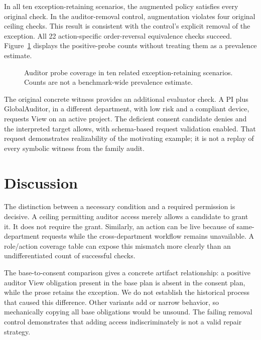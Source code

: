 \documentclass[sigconf,nonacm]{acmart}
\begin{document}
In all ten exception-retaining scenarios, the augmented policy satisfies every original check. In the auditor-removal control, augmentation violates four original ceiling checks. This result is consistent with the control's explicit removal of the exception. All 22 action-specific order-reversal equivalence checks succeed. Figure~\ref{fig:counts} displays the positive-probe counts without treating them as a prevalence estimate.

\begin{figure}[t]
\centering
{}
\caption{Auditor probe coverage in ten related exception-retaining scenarios. Counts are not a benchmark-wide prevalence estimate.}
\label{fig:counts}
\end{figure}

The original concrete witness provides an additional evaluator check. A PI plus GlobalAuditor, in a different department, with low risk and a compliant device, requests View on an active project. The deficient consent candidate denies and the interpreted target allows, with schema-based request validation enabled. That request demonstrates realizability of the motivating example; it is not a replay of every symbolic witness from the family audit.

\section{Discussion}
The distinction between a necessary condition and a required permission is decisive. A ceiling permitting auditor access merely allows a candidate to grant it. It does not require the grant. Similarly, an action can be live because of same-department requests while the cross-department workflow remains unavailable. A role/action coverage table can expose this mismatch more clearly than an undifferentiated count of successful checks.

The base-to-consent comparison gives a concrete artifact relationship: a positive auditor View obligation present in the base plan is absent in the consent plan, while the prose retains the exception. We do not establish the historical process that caused this difference. Other variants add or narrow behavior, so mechanically copying all base obligations would be unsound. The failing removal control demonstrates that adding access indiscriminately is not a valid repair strategy.
\end{document}
